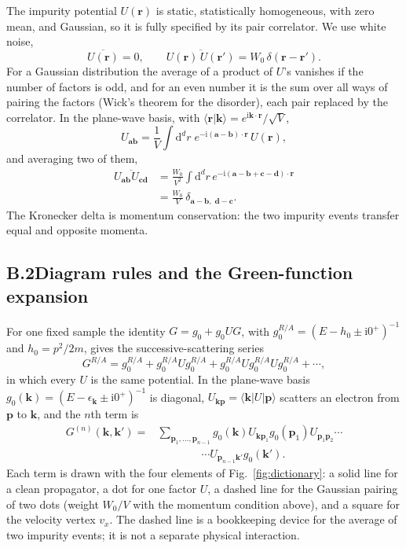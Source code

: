 The impurity potential $U(\mathbf r)$ is static, statistically
homogeneous, with zero mean, and Gaussian, so it is fully specified
by its pair correlator. We use white noise,
\[
\overline{U(\mathbf r)}=0,\qquad
\overline{U(\mathbf r)\,U(\mathbf r')}
=W_0\,\delta(\mathbf r-\mathbf r').
\]
For a Gaussian distribution the average of a product of $U$'s
vanishes if the number of factors is odd, and for an even number
it is the sum over all ways of pairing the factors (Wick's theorem
for the disorder), each pair replaced by the correlator. In the
plane-wave basis, with
$\langle\mathbf r|\mathbf k\rangle
=e^{\mathrm{i}\mathbf k\cdot\mathbf r}/\sqrt V$,
\[
U_{\mathbf a\mathbf b}
=\frac1V\int\mathrm{d}^dr\;
e^{-\mathrm{i}(\mathbf a-\mathbf b)\cdot\mathbf r}\,
U(\mathbf r),
\]
and averaging two of them,
\begin{equation}
\begin{aligned}
\overline{U_{\mathbf a\mathbf b}U_{\mathbf c\mathbf d}}
&=\frac{W_0}{V^2}\int\mathrm{d}^dr\,
e^{-\mathrm{i}(\mathbf a-\mathbf b+\mathbf c-\mathbf d)
\cdot\mathbf r}\\
&=\frac{W_0}{V}\,
\delta_{\mathbf a-\mathbf b,\;\mathbf d-\mathbf c}.
\end{aligned}
\label{eq:pairrule}
\end{equation}
The Kronecker delta is momentum conservation: the two impurity
events transfer equal and opposite momenta.

\subsection*{B.2\quad Diagram rules and the Green-function expansion}

For one fixed sample the identity
$G=g_0+g_0UG$, with
$g_0^{R/A}=(E-h_0\pm\mathrm{i}0^+)^{-1}$ and
$h_0=p^2/2m$, gives the successive-scattering series
\[
G^{R/A}
=g_0^{R/A}
+g_0^{R/A}Ug_0^{R/A}
+g_0^{R/A}Ug_0^{R/A}Ug_0^{R/A}
+\cdots ,
\]
in which every $U$ is the same potential. In the plane-wave basis
$g_0(\mathbf k)=(E-\epsilon_{\mathbf k}\pm\mathrm{i}0^+)^{-1}$
is diagonal, $U_{\mathbf k\mathbf p}
=\langle\mathbf k|U|\mathbf p\rangle$ scatters an electron from
$\mathbf p$ to $\mathbf k$, and the $n$th term is
\[
\begin{aligned}
G^{(n)}(\mathbf k,\mathbf k')
={}&\sum_{\mathbf p_1,\dots,\mathbf p_{n-1}}
g_0(\mathbf k)U_{\mathbf k\mathbf p_1}
g_0(\mathbf p_1)U_{\mathbf p_1\mathbf p_2}
\cdots\\
&\qquad\qquad\cdots
U_{\mathbf p_{n-1}\mathbf k'}g_0(\mathbf k').
\end{aligned}
\]
Each term is drawn with the four elements of
Fig.~\ref{fig:dictionary}: a solid line for a clean propagator,
a dot for one factor $U$, a dashed line for the Gaussian pairing
of two dots (weight $W_0/V$ with the momentum condition above),
and a square for the velocity vertex $v_x$. The dashed line is a
bookkeeping device for the average of two impurity events; it is
not a separate physical interaction.

